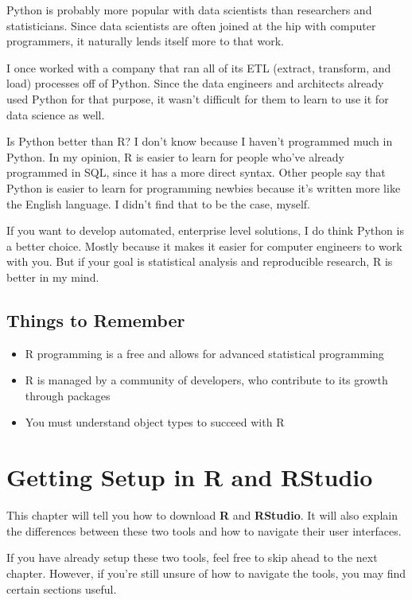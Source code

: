 \documentclass[
]{book}
\providecommand{\tightlist}{%
  \setlength{\itemsep}{0pt}\setlength{\parskip}{0pt}}
\begin{document}
Python is probably more popular with data scientists than researchers and statisticians. Since data scientists are often joined at the hip with computer programmers, it naturally lends itself more to that work.

I once worked with a company that ran all of its ETL (extract, transform, and load) processes off of Python. Since the data engineers and architects already used Python for that purpose, it wasn't difficult for them to learn to use it for data science as well.

Is Python better than R? I don't know because I haven't programmed much in Python. In my opinion, R is easier to learn for people who've already programmed in SQL, since it has a more direct syntax. Other people say that Python is easier to learn for programming newbies because it's written more like the English language. I didn't find that to be the case, myself.

If you want to develop automated, enterprise level solutions, I do think Python is a better choice. Mostly because it makes it easier for computer engineers to work with you. But if your goal is statistical analysis and reproducible research, R is better in my mind.

\hypertarget{things-to-remember}{%
\section{Things to Remember}\label{things-to-remember}}

\begin{itemize}
\tightlist
\item
  R programming is a free and allows for advanced statistical programming
\item
  R is managed by a community of developers, who contribute to its growth through packages
\item
  You must understand object types to succeed with R
\end{itemize}

\hypertarget{setup}{%
\chapter{Getting Setup in R and RStudio}\label{setup}}

This chapter will tell you how to download \textbf{R} and \textbf{RStudio}. It will also explain the differences between these two tools and how to navigate their user interfaces.

If you have already setup these two tools, feel free to skip ahead to the next chapter. However, if you're still unsure of how to navigate the tools, you may find certain sections useful.
\end{document}
